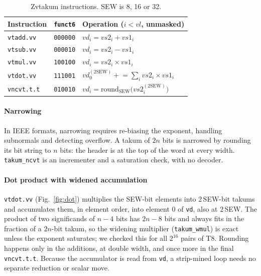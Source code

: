 \documentclass[conference]{IEEEtran}
\newcommand{\code}[1]{\texttt{#1}}
\begin{document}
\begin{table}[t]
\caption{Zvtakum instructions. SEW is 8, 16 or 32.}
\label{tab:isa}
\centering
\begin{tabular}{@{}lll@{}}
\toprule
Instruction & \code{funct6} & Operation ($i<\mathit{vl}$, unmasked)\\
\midrule
\code{vtadd.vv} & \code{000000} & $vd_i = vs2_i + vs1_i$\\
\code{vtsub.vv} & \code{000010} & $vd_i = vs2_i - vs1_i$\\
\code{vtmul.vv} & \code{100100} & $vd_i = vs2_i \times vs1_i$\\
\code{vtdot.vv} & \code{111001} & $vd_0^{(2\mathrm{SEW})} \mathrel{+}= \sum_i vs2_i \times vs1_i$\\
\code{vncvt.t.t} & \code{010010} & $vd_i = \mathrm{round}_{\mathrm{SEW}}\bigl(vs2_i^{(2\mathrm{SEW})}\bigr)$\\
\bottomrule
\end{tabular}
\end{table}

\paragraph*{Narrowing} In IEEE formats, narrowing requires re-biasing the exponent, handling subnormals
and detecting overflow. A takum of $2n$ bits is narrowed by rounding its bit string to $n$ bits: the
header is at the top of the word at every width. \code{takum\_ncvt} is an incrementer and a saturation
check, with no decoder.

\paragraph*{Dot product with widened accumulation} \code{vtdot.vv} (Fig.~\ref{fig:dot}) multiplies the
SEW-bit elements into $2\,$SEW-bit takums and accumulates them, in element order, into element 0 of
\code{vd}, also at $2\,$SEW. The product of two significands of $n-4$ bits has $2n-8$ bits and always
fits in the fraction of a $2n$-bit takum, so the widening multiplier (\code{takum\_wmul}) is exact unless
the exponent saturates; we checked this for all $2^{16}$ pairs of T8. Rounding happens only in the
additions, at double width, and once more in the final \code{vncvt.t.t}. Because the accumulator is read
from \code{vd}, a strip-mined loop needs no separate reduction or scalar move.
\end{document}
